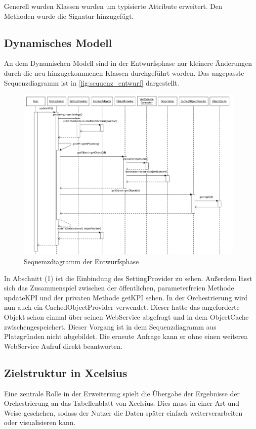 Generell wurden Klassen wurden um typisierte Attribute erweitert. Den Methoden wurde die Signatur hinzugefügt.

\subsection{Dynamisches Modell}

An dem Dynamischen Modell sind in der Entwurfsphase nur kleinere Änderungen durch die neu hinzugekommenen Klassen durchgeführt worden. Das angepasste Sequenzdiagramm ist in \vref{fig:sequenz_entwurf} dargestellt.

\begin{figure}[h]
\centering
\setlength{\unitlength}{1mm}
\includegraphics[width=15cm]{Visio/Entwurf-Sequenz.pdf}
\caption{Sequemzdiagramm der Entwurfsphase\label{fig:sequenz_entwurf}}
\end{figure}

In Abschnitt (1) ist die Einbindung des SettingProvider zu sehen. Außerdem lässt sich das Zusammenspiel zwischen der öffentlichen, parameterfreien Methode updateKPI und der privaten Methode getKPI sehen. In der Orchestrierung wird nun auch ein CachedObjectProvider verwendet. Dieser hatte das angeforderte Objekt schon einmal über seinen WebService abgefragt und in dem ObjectCache zwischengespeichert. Dieser Vorgang ist in dem Sequenzdiagramm aus Platzgründen nicht abgebildet. Die erneute Anfrage kann er ohne einen weiteren WebService Aufruf direkt beantworten.

\subsection{Zielstruktur in Xcelsius}
Eine zentrale Rolle in der Erweiterung spielt die Übergabe der Ergebnisse der Orchestrierung an das Tabellenblatt von Xcelsius. Dies muss in einer Art und Weise geschehen, sodass der Nutzer die Daten später einfach weiterverarbeiten oder visualisieren kann.

